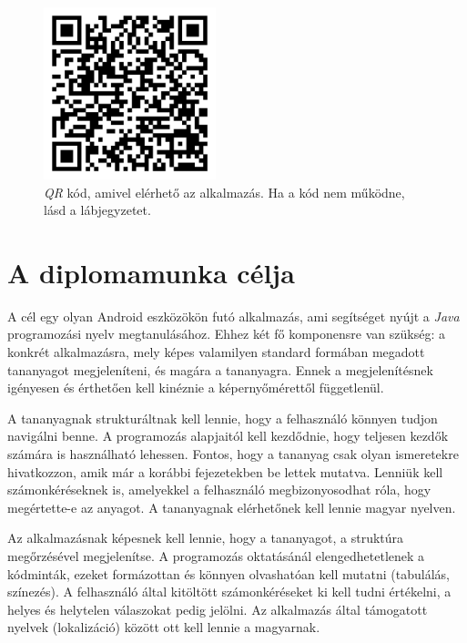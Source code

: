 \documentclass[12pt,a4paper]{article}
\begin{document}
	 \begin{figure}[h!]
	 	\centering
	 	\includegraphics[width=5cm]{learn_java_qr_code}
	 	\caption[Alkalmazás QR Caption]{\textit{QR} kód, amivel elérhető az alkalmazás. Ha a kód nem működne, lásd a lábjegyzetet\footnotemark.}
	 	\label{qr}
	 \end{figure}

	\section{A diplomamunka célja}\label{celok}
	
	A cél egy olyan Android eszközökön futó alkalmazás, ami segítséget nyújt a \textit{Java} programozási nyelv megtanulásához. Ehhez két fő komponensre van szükség: a konkrét alkalmazásra, mely képes valamilyen standard formában megadott tananyagot megjeleníteni, és magára a tananyagra. Ennek a megjelenítésnek igényesen és érthetően kell kinéznie a képernyőmérettől függetlenül.

	A tananyagnak strukturáltnak kell lennie, hogy a felhasználó könnyen tudjon navigálni benne. A programozás alapjaitól kell kezdődnie, hogy teljesen kezdők számára is használható lehessen. Fontos, hogy a tananyag csak olyan ismeretekre hivatkozzon, amik már a korábbi fejezetekben be lettek mutatva. Lenniük kell számonkéréseknek is, amelyekkel a felhasználó megbizonyosodhat róla, hogy megértette-e az anyagot. A tananyagnak elérhetőnek kell lennie magyar nyelven.
	
	Az alkalmazásnak képesnek kell lennie, hogy a tananyagot, a struktúra megőrzésével megjelenítse. A programozás oktatásánál elengedhetetlenek a kódminták, ezeket formázottan és könnyen olvashatóan kell mutatni (tabulálás, színezés). A felhasználó által kitöltött számonkéréseket ki kell tudni értékelni, a helyes és helytelen válaszokat pedig jelölni. Az alkalmazás által támogatott nyelvek (lokalizáció) között ott kell lennie a magyarnak.
	
\end{document}
